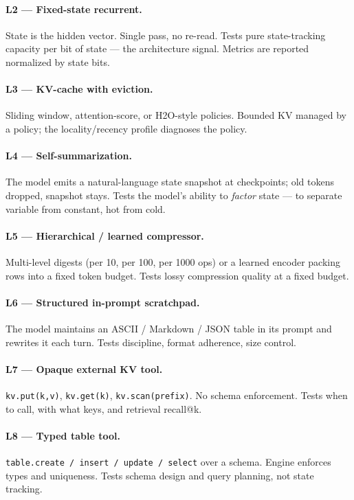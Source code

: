 \documentclass[11pt]{article}
\begin{document}
\paragraph{L2 --- Fixed-state recurrent.}
State is the hidden vector. Single pass, no re-read. Tests pure
state-tracking capacity per bit of state --- the architecture signal.
Metrics are reported normalized by state bits.

\paragraph{L3 --- KV-cache with eviction.}
Sliding window, attention-score, or H2O-style policies. Bounded KV
managed by a policy; the locality/recency profile diagnoses the policy.

\paragraph{L4 --- Self-summarization.}
The model emits a natural-language state snapshot at checkpoints; old
tokens dropped, snapshot stays. Tests the model's ability to
\emph{factor} state --- to separate variable from constant, hot from
cold.

\paragraph{L5 --- Hierarchical / learned compressor.}
Multi-level digests (per 10, per 100, per 1000 ops) or a learned encoder
packing rows into a fixed token budget. Tests lossy compression quality
at a fixed budget.

\paragraph{L6 --- Structured in-prompt scratchpad.}
The model maintains an ASCII / Markdown / JSON table in its prompt and
rewrites it each turn. Tests discipline, format adherence, size control.

\paragraph{L7 --- Opaque external KV tool.}
\texttt{kv.put(k,v)}, \texttt{kv.get(k)}, \texttt{kv.scan(prefix)}. No
schema enforcement. Tests when to call, with what keys, and
retrieval recall@k.

\paragraph{L8 --- Typed table tool.}
\texttt{table.create / insert / update / select} over a schema. Engine
enforces types and uniqueness. Tests schema design and query planning,
not state tracking.
\end{document}
